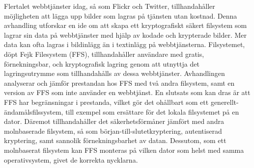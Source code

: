 Flertalet webbtjänster idag, så som Flickr och Twitter, tillhandahåller möjligheten att lägga upp bilder som lagras på tjänsten utan kostnad. Denna avhandling utforskar en ide om att skapa ett kryptografiskt säkert filsystem som lagrar sin data på webbtjänster med hjälp av kodade och krypterade bilder. Mer data kan ofta lagras i bildinlägg än i textinlägg på webbtjänsterna. Filsystemet, döpt Fejk Filesystem (FFS), tillhandahåller användare med gratis, förnekningsbar, och kryptografisk lagring genom att utnyttja det lagringsutrymme som tillhandahålls av dessa webbtjänster. Avhandlingen analyserar och jämför prestandan hos FFS med två andra filsystem, samt en version av FFS som inte använder en webbtjänst. En slutsats som kan dras är att FFS har begränsningar i prestanda, vilket gör det ohållbart som ett generellt-ändamålsfilssystem, till exempel som ersättare för det lokala filsystemet på en dator. Däremot tillhandahåller det säkerhetsförmåner jämfört med andra molnbaserade filsystem, så som början-till-slutetkryptering, autentiserad kryptering, samt sannolik förnekningsbarhet av datan. Dessutom, som ett molnbaserat filsystem kan FFS monteras på vilken dator som helst med samma operativsystem, givet de korrekta nycklarna. 